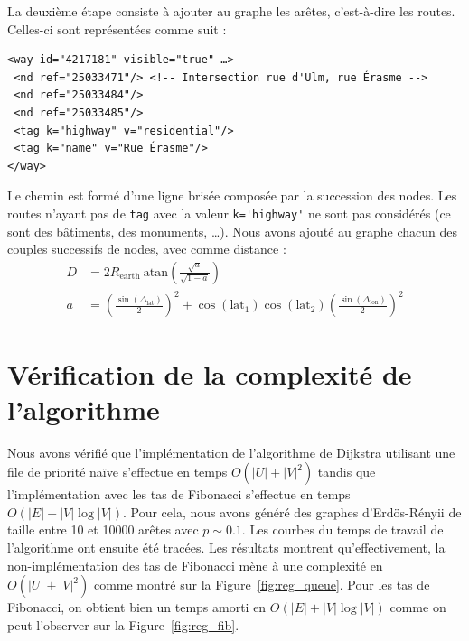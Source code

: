 \documentclass{article}
\begin{document}
La deuxième étape consiste à ajouter au graphe les arêtes,
c'est-à-dire les routes. Celles-ci sont représentées comme suit :
\begin{verbatim}
<way id="4217181" visible="true" …>
 <nd ref="25033471"/> <!-- Intersection rue d'Ulm, rue Érasme -->
 <nd ref="25033484"/>
 <nd ref="25033485"/>
 <tag k="highway" v="residential"/>
 <tag k="name" v="Rue Érasme"/>
</way>
\end{verbatim}
Le chemin est formé d'une ligne brisée composée par la succession des nodes.
Les routes n'ayant pas de \verb|tag| avec la valeur \verb|k='highway'|
ne sont pas considérés (ce sont des bâtiments, des monuments, …). Nous
avons ajouté au graphe chacun des couples successifs de nodes, avec
comme distance :
\begin{align*}
  D & = 2 R_\mathrm{earth}\ \mathrm{atan} \left( \frac{\sqrt{a}}{\sqrt{1-a}} \right) \\
  a & = \left( \frac{\sin(\Delta_\mathrm{lat})}{2} \right)^2 +
      \cos(\mathrm{lat_1})\cos(\mathrm{lat_2}) \left( \frac{\sin(\Delta_\mathrm{lon})}{2} \right)^2
\end{align*}

\section{Vérification de la complexité de l'algorithme}
Nous avons vérifié que l'implémentation de l'algorithme de Dijkstra
utilisant une file de priorité naïve s'effectue en temps $O(|U| + |V|^2)$ tandis
que l'implémentation avec les tas de Fibonacci s'effectue en temps
$O(|E| + |V|\log |V|)$. Pour cela, nous avons généré des graphes
d'Erdös-Rényii de taille entre 10 et 10000 arêtes avec $p\sim
0.1$. Les courbes du temps de travail de l'algorithme ont ensuite été
tracées. Les résultats montrent qu'effectivement, la
non-implémentation des tas de Fibonacci mène à une complexité en
$O(|U| + |V|^2)$ comme montré sur la Figure~\ref{fig:reg_queue}. Pour
les tas de Fibonacci, on obtient bien un temps amorti en $O(|E| +
|V|\log |V|)$ comme on peut l'observer sur la Figure~\ref{fig:reg_fib}.
\end{document}

